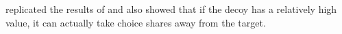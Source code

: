 \textcite{huber1983market} replicated the results of \textcite{huber1983market} and also showed that if the decoy has a relatively high value, it can actually take choice shares away from the target. 

